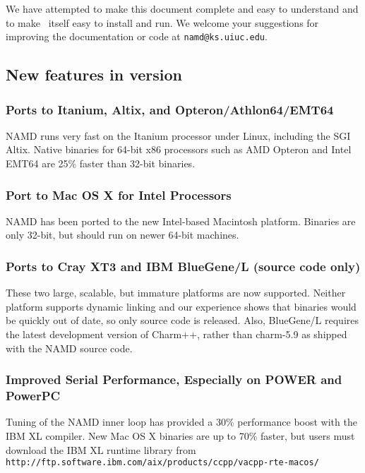 We have attempted to make this document 
complete and easy to understand and to make \NAMD\ itself
easy to install and run.
We welcome your suggestions for improving the documentation or code
at {\tt namd@ks.uiuc.edu}.

\subsection{New features in version \NAMDVER}

\subsubsection*{Ports to Itanium, Altix, and Opteron/Athlon64/EMT64}

NAMD runs very fast on the Itanium processor under Linux, including
the SGI Altix.  Native binaries for 64-bit x86 processors such as
AMD Opteron and Intel EMT64 are 25\% faster than 32-bit binaries.

\subsubsection*{Port to Mac OS X for Intel Processors}

NAMD has been ported to the new Intel-based Macintosh platform.
Binaries are only 32-bit, but should run on newer 64-bit machines.

\subsubsection*{Ports to Cray XT3 and IBM BlueGene/L (source code only)}

These two large, scalable, but immature platforms are now
supported.  Neither platform supports dynamic linking and our
experience shows that binaries would be quickly out of date, so
only source code is released.  Also, BlueGene/L requires the
latest development version of Charm++, rather than charm-5.9
as shipped with the NAMD source code.

\subsubsection*{Improved Serial Performance, Especially on POWER and PowerPC}

Tuning of the NAMD inner loop has provided a 30\% performance boost
with the IBM XL compiler.  New Mac OS X binaries are up to 70\%
faster, but users must download the IBM XL runtime library from
{\tt http://ftp.software.ibm.com/aix/products/ccpp/vacpp-rte-macos/}

